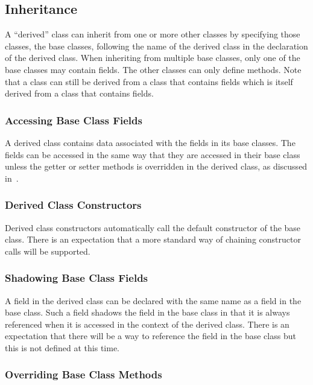 \subsection{Inheritance}
\label{Inheritance}

A ``derived'' class can inherit from one or more other classes by
specifying those classes, the base classes, following the name of the
derived class in the declaration of the derived class.  When
inheriting from multiple base classes, only one of the base classes
may contain fields.  The other classes can only define methods.  Note
that a class can still be derived from a class that contains fields
which is itself derived from a class that contains fields.

\subsubsection{Accessing Base Class Fields}
\label{Accessing_Base_Class_Fields}

A derived class contains data associated with the fields in its base
classes.  The fields can be accessed in the same way that they are
accessed in their base class unless the getter or setter methods is
overridden in the derived class, as discussed
in~.

\subsubsection{Derived Class Constructors}
\label{Derived_Class_Constructors}

Derived class constructors automatically call the default constructor
of the base class.  There is an expectation that a more standard way
of chaining constructor calls will be supported.

\subsubsection{Shadowing Base Class Fields}
\label{Shadowing_Base_Class_Fields}

A field in the derived class can be declared with the same name as a
field in the base class.  Such a field shadows the field in the base
class in that it is always referenced when it is accessed in the
context of the derived class.  There is an expectation that there will
be a way to reference the field in the base class but this is not
defined at this time.

\subsubsection{Overriding Base Class Methods}
\label{Overriding_Base_Class_Methods}

